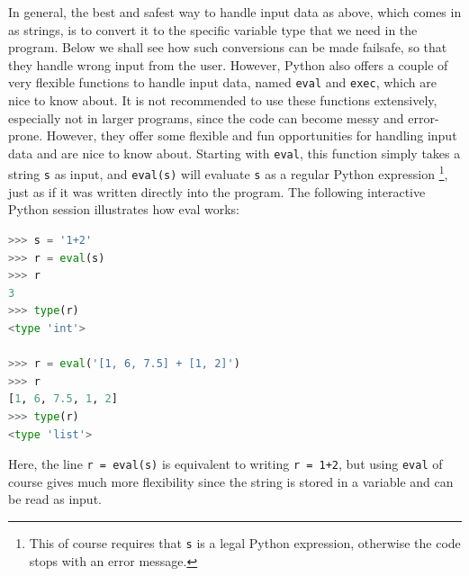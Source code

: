 \documentclass[graybox,envcountchap,sectrefs,final]{svmonodo}
\begin{document}
In general, the best and safest way to handle input data as above, which comes in as strings, is to convert it to the specific
variable type that we need in the program. Below we shall see how such conversions can be made failsafe, so that they
handle wrong input from the user. However, Python also offers a couple of very flexible functions to handle input data, named
\texttt{eval} and \texttt{exec}, which are nice to know about. It is not recommended to use these functions extensively, especially not in larger
programs, since the code can become messy and error-prone. However, they offer some flexible and fun opportunities for
handling input data and are nice to know about. Starting with \texttt{eval}, this function simply takes a string \texttt{s} as input, and
\texttt{eval(s)} will evaluate \texttt{s} as a regular Python expression \footnote{This of course requires that \texttt{s} is a legal Python expression, otherwise the code stops with an error message.}, just as if it was written directly into the program.
The following interactive Python session illustrates how eval works:
\begin{lstlisting}[language=Python,style=blue1]
>>> s = '1+2'
>>> r = eval(s)
>>> r
3
>>> type(r)
<type 'int'>

>>> r = eval('[1, 6, 7.5] + [1, 2]')
>>> r
[1, 6, 7.5, 1, 2]
>>> type(r)
<type 'list'>
\end{lstlisting}
Here, the line \texttt{r = eval(s)} is equivalent to writing \texttt{r = 1+2}, but using \texttt{eval} of course gives much more flexibility since
the string is stored in a variable and can be read as input.
\end{document}
